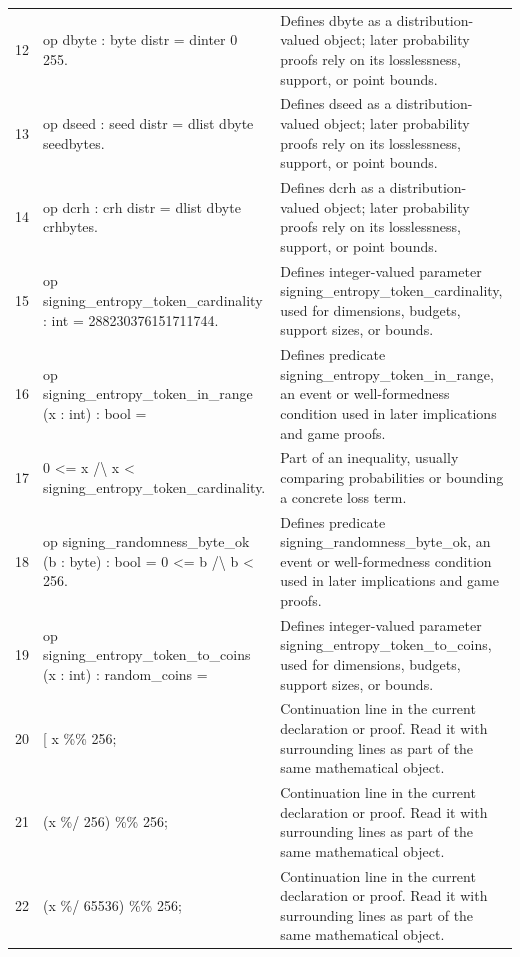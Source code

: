 \documentclass[10pt]{article}
\begin{document}
\begin{longtable}{r L{0.53\textwidth} L{0.37\textwidth}}
12 & {\ttfamily\scriptsize op dbyte : byte distr = dinter 0 255.} & Defines dbyte as a distribution-valued object; later probability proofs rely on its losslessness, support, or point bounds. \\
13 & {\ttfamily\scriptsize op dseed : seed distr = dlist dbyte seedbytes.} & Defines dseed as a distribution-valued object; later probability proofs rely on its losslessness, support, or point bounds. \\
14 & {\ttfamily\scriptsize op dcrh : crh distr = dlist dbyte crhbytes.} & Defines dcrh as a distribution-valued object; later probability proofs rely on its losslessness, support, or point bounds. \\
15 & {\ttfamily\scriptsize op signing\_entropy\_token\_cardinality : int = 288230376151711744.} & Defines integer-valued parameter signing\_entropy\_token\_cardinality, used for dimensions, budgets, support sizes, or bounds. \\
16 & {\ttfamily\scriptsize op signing\_entropy\_token\_in\_range (x : int) : bool =} & Defines predicate signing\_entropy\_token\_in\_range, an event or well-formedness condition used in later implications and game proofs. \\
17 & {\ttfamily\scriptsize   0 <= x /\textbackslash{} x < signing\_entropy\_token\_cardinality.} & Part of an inequality, usually comparing probabilities or bounding a concrete loss term. \\
18 & {\ttfamily\scriptsize op signing\_randomness\_byte\_ok (b : byte) : bool = 0 <= b /\textbackslash{} b < 256.} & Defines predicate signing\_randomness\_byte\_ok, an event or well-formedness condition used in later implications and game proofs. \\
19 & {\ttfamily\scriptsize op signing\_entropy\_token\_to\_coins (x : int) : random\_coins =} & Defines integer-valued parameter signing\_entropy\_token\_to\_coins, used for dimensions, budgets, support sizes, or bounds. \\
20 & {\ttfamily\scriptsize   [ x \%\% 256;} & Continuation line in the current declaration or proof.  Read it with surrounding lines as part of the same mathematical object. \\
21 & {\ttfamily\scriptsize     (x \%/ 256) \%\% 256;} & Continuation line in the current declaration or proof.  Read it with surrounding lines as part of the same mathematical object. \\
22 & {\ttfamily\scriptsize     (x \%/ 65536) \%\% 256;} & Continuation line in the current declaration or proof.  Read it with surrounding lines as part of the same mathematical object. \\

\end{longtable}
\end{document}
